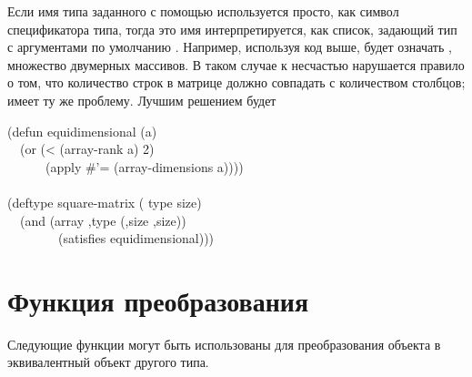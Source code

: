 \begin{defmac}
Если имя типа заданного с помощью  используется просто, как символ
спецификатора типа, тогда это имя интерпретируется, как список, задающий тип с
аргументами по умолчанию \cdf{*}. Например, используя код выше,
 будет означать , множество двумерных
массивов.
В таком случае к несчастью нарушается правило о том, что количество строк в
матрице должно совпадать с количеством столбцов;  имеет
ту же проблему.
Лучшим решением будет
\begin{lisp}
(defun equidimensional (a) \\
~~(or (< (array-rank a) 2) \\
~~~~~~(apply \#'= (array-dimensions a)))) \\
 \\
(deftype square-matrix ( type size) \\
~~{\Xbq}(and (array ,type (,size ,size)) \\
~~~~~~~~(satisfies equidimensional)))
\end{lisp}

\end{defmac}

\section{Функция преобразования}

Следующие функции могут быть использованы для преобразования объекта в
эквивалентный объект другого типа.

